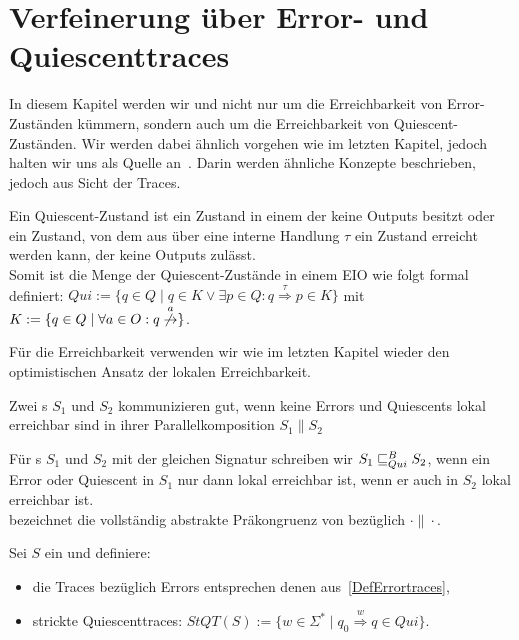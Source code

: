 \chapter{Verfeinerung über Error- und Quiescenttraces}

In diesem Kapitel werden wir und nicht nur um die Erreichbarkeit von
Error-Zuständen kümmern, sondern auch um die Erreichbarkeit von
Quiescent-Zuständen. Wir werden dabei ähnlich vorgehen wie im letzten Kapitel,
jedoch halten wir uns als Quelle an~\cite{Chilton2013}. Darin werden ähnliche Konzepte
beschrieben, jedoch aus Sicht der Traces.

\begin{Def}[Quiescent]
  Ein Quiescent-Zustand ist ein Zustand in einem \EIO{} der keine Outputs besitzt
  oder ein Zustand, von dem aus über eine interne Handlung $\tau$ ein Zustand
  erreicht werden kann, der keine Outputs zulässt.\\
  Somit ist die Menge der Quiescent-Zustände in einem EIO wie folgt formal
  definiert: $Qui:=\{q\in Q\mid q\in K\vee \exists p\in Q:
  q\overset{\tau}{\Rightarrow} p\in K\}$ mit $K:=\{q\in Q\mid \forall a\in O:
  q\overset{a}{\not{\hspace{-0.1cm}\rightarrow}}\}$.
\end{Def}

Für die Erreichbarkeit verwenden wir wie im letzten Kapitel wieder den
optimistischen Ansatz der lokalen Erreichbarkeit.

\begin{Def}
  Zwei \EIO{}s $S_1$ und $S_2$ kommunizieren gut, wenn keine Errors und Quiescents
  lokal erreichbar sind in ihrer Parallelkomposition $S_1\| S_2$
\end{Def}

\begin{Def}
  Für \EIO{}s $S_1$ und $S_2$ mit der gleichen Signatur schreiben wir
  $S_1\sqsubseteq _{Qui}^B S_2$, wenn ein Error oder Quiescent in $S_1$ nur
  dann lokal erreichbar ist, wenn er auch in $S_2$ lokal erreichbar ist.\\
  \QCRel{} bezeichnet die vollständig abstrakte Präkongruenz von \QBRel{}
  bezüglich $\cdot\|\cdot$.
\end{Def}

\begin{Def}
  \label{DefQuiescenttraces}
  Sei $S$ ein \EIO{} und definiere:
  \begin{itemize}
    \item die Traces bezüglich Errors entsprechen denen
      aus~\ref{DefErrortraces},
    \item strickte Quiescenttraces: $StQT(S) := \{w\in\Sigma ^*\mid q_0
      \overset{w}{\Rightarrow} q\in Qui\}$.
  \end{itemize}
\end{Def}

